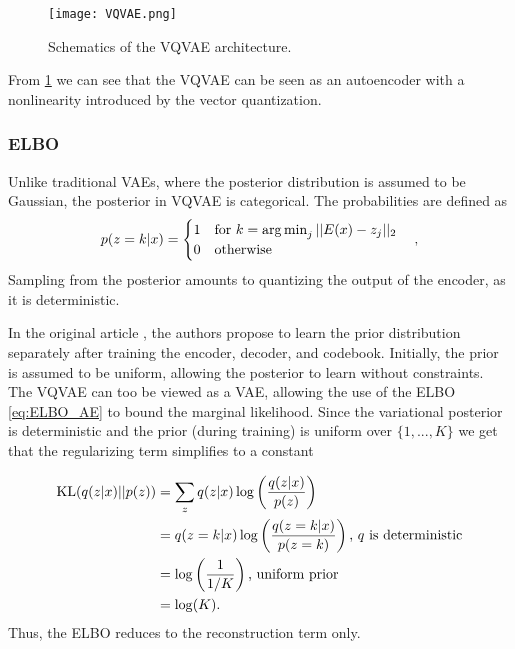 \documentclass[../../thesis.tex]{subfiles}
\begin{document}
\begin{figure}[h]
    \texttt{[image: VQVAE.png]}
    \centering
    \caption{Schematics of the VQVAE architecture.}
    \label{fig:VQVAE}
\end{figure}
From \ref{fig:VQVAE} we can see that the VQVAE can be seen as an autoencoder with a nonlinearity introduced by the vector quantization.

\subsubsection{ELBO}
Unlike traditional VAEs, where the posterior distribution is assumed to be Gaussian, the posterior in VQVAE is categorical. The probabilities are defined as
\begin{equation}
    p(z=k | x) = 
    \begin{cases} 
        1 \quad \text{for }k = \operatorname*{arg\,min}_j||E(x) - z_j||_2 \\
        0 \quad \text{otherwise}
    \end{cases},
\end{equation}
Sampling from the posterior amounts to quantizing the output of the encoder, as it is deterministic. \newline

In the original article \cite{VQVAE}, the authors propose to learn the prior distribution separately after training the encoder, decoder, and codebook. Initially, the prior is assumed to be uniform, allowing the posterior to learn without constraints. The VQVAE can too be viewed as a VAE, allowing the use of the ELBO \ref{eq:ELBO_AE} to bound the marginal likelihood. Since the variational posterior is deterministic and the prior (during training) is uniform over $\{1,...,K\}$ we get that the regularizing term simplifies to a constant

\begin{equation}
    \begin{aligned}
        \operatorname*{\mathrm{KL}}(q(z|x)||p(z)) &= \sum_{z}  q(z|x) \log \left(\frac{q(z|x)}{p(z)}\right) \\
                           &= q(z=k|x) \log \left(\frac{q(z=k|x)}{p(z=k)}\right) \text{, $q$ is deterministic}\\
                           &= \log \left(\frac{1}{1/K}\right) \text{, uniform prior}\\
                           &= \log(K).
    \end{aligned}
\end{equation}
Thus, the ELBO reduces to the reconstruction term only.
\end{document}
